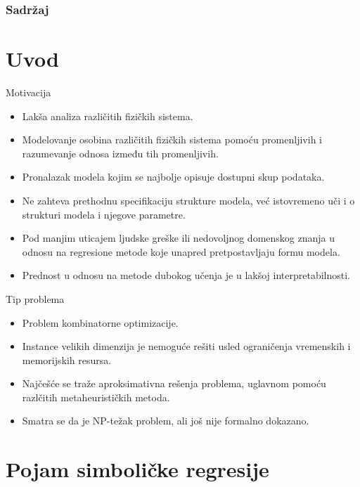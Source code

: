 \documentclass{beamer}
\begin{document}
\begin{frame}\frametitle{Sadržaj}\tableofcontents
\end{frame} 

\section{Uvod} 
\begin{frame} {Motivacija} 
\begin{itemize}
    \item Lakša analiza različitih fizičkih sistema.
    \item Modelovanje osobina različitih fizičkih sistema pomoću promenljivih i razumevanje odnosa između tih promenljivih.
    \item Pronalazak modela kojim se najbolje opisuje dostupni skup podataka.
    \item Ne zahteva prethodnu specifikaciju strukture modela, već istovremeno uči i o strukturi modela i njegove parametre.
    \item Pod manjim uticajem ljudske greške ili nedovoljnog domenskog znanja u odnosu na regresione metode koje unapred pretpostavljaju formu modela.
    \item Prednost u odnosu na metode dubokog učenja je u lakšoj interpretabilnosti.
\end{itemize}

\end{frame}

\begin{frame}{Tip problema}
\begin{itemize}
    \item Problem kombinatorne optimizacije.
    \item Instance velikih dimenzija je nemoguće rešiti usled ograničenja vremenskih i memorijskih resursa.
    \item Najčešće se traže aproksimativna rešenja problema, uglavnom pomoću razlčitih metaheurističkih metoda.
    \item Smatra se da je NP-težak problem, ali još nije formalno dokazano.
\end{itemize}
\end{frame}

\section{Pojam simboličke regresije}
\end{document}
